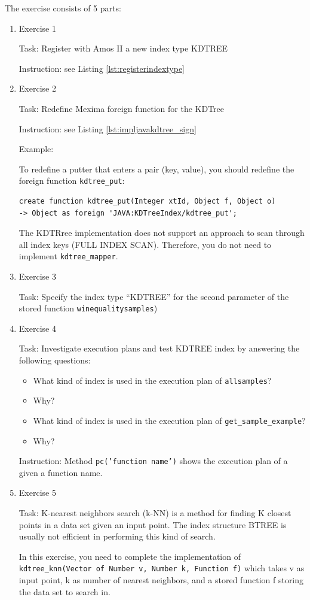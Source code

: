 \documentclass[12pt]{article}
\begin{document}
The exercise consists of 5 parts:
\begin{enumerate}
\item Exercise 1

Task: Register with Amos II a new index type KDTREE

Instruction: see Listing \ref{lst:registerindextype}
\item  Exercise 2

Task: Redefine Mexima foreign function for the KDTree

Instruction: see Listing \ref{lst:impljavakdtree_sign}

Example:

To redefine a putter that enters a pair (key, value), you should
redefine the foreign function {\tt kdtree\_put}:

\begin{verbatim}
create function kdtree_put(Integer xtId, Object f, Object o)
-> Object as foreign 'JAVA:KDTreeIndex/kdtree_put';
\end{verbatim}

The KDTRree implementation does not support an approach to scan
through all index keys (FULL INDEX SCAN). Therefore, you do not need
to implement {\tt kdtree\_mapper}.
\item  Exercise 3

Task: Specify the index type ``KDTREE'' for the second parameter of
the stored function
\texttt{winequalitysamples})
\item  Exercise 4

Task: Investigate execution plans and test KDTREE index by answering
the following questions:
\begin{itemize}
\item What kind of index is used in the execution plan of \texttt{allsamples}?
\item Why?
\item What kind of index is used in the execution plan of \texttt{get\_sample\_example}?
\item Why?
\end{itemize}
Instruction: Method \texttt{pc('function name')} shows the execution
plan of a given a function name.
\item  Exercise 5

Task: K-nearest neighbors search (k-NN) is a method for finding K
closest points in a data set given an input point. The index structure
BTREE is usually not efficient in performing this kind of search.

In this exercise, you need to complete the implementation of
\texttt{kdtree\_knn(Vector of Number v, Number k, Function f)} which
takes v as input point, k as number of nearest neighbors, and a stored
function f storing the data set to search in.


\end{enumerate}
\end{document}
